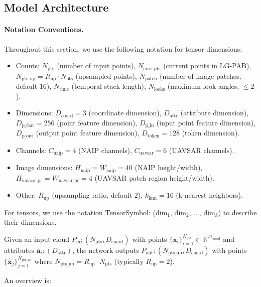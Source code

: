 \documentclass[preprint,12pt,authoryear]{elsarticle}
\begin{document}
\subsection{Model Architecture}
\label{sec:architecture}

\paragraph{Notation Conventions.}
Throughout this section, we use the following notation for tensor dimensions:
\begin{itemize}
    \item Counts: $N_{\text{pts}}$ (number of input points), $N_{\text{curr\_pts}}$ (current points in LG-PAB), $N_{\text{pts\_up}} = R_{\text{up}} \cdot N_{\text{pts}}$ (upsampled points), $N_{\text{patch}}$ (number of image patches, default 16), $N_{\text{time}}$ (temporal stack length), $N_{\text{looks}}$ (maximum look angles, $\leq 2$).
    \item Dimensions: $D_{\text{coord}} = 3$ (coordinate dimension), $D_{\text{attr}}$ (attribute dimension), $D_{\text{p\_feat}} = 256$ (point feature dimension), $D_{\text{p\_in}}$ (input point feature dimension), $D_{\text{p\_out}}$ (output point feature dimension), $D_{\text{token}} = 128$ (token dimension).
    \item Channels: $C_{\text{naip}} = 4$ (NAIP channels), $C_{\text{uavsar}} = 6$ (UAVSAR channels).
    \item Image dimensions: $H_{\text{naip}} = W_{\text{naip}} = 40$ (NAIP height/width), $H_{\text{uavsar\_pr}} = W_{\text{uavsar\_pr}} = 4$ (UAVSAR patch region height/width).
    \item Other: $R_{\text{up}}$ (upsampling ratio, default 2), $k_{\text{knn}} = 16$ (k-nearest neighbors).
\end{itemize}
For tensors, we use the notation TensorSymbol: (dim$_1$, dim$_2$, ..., dim$_k$) to describe their dimensions.

Given an input cloud $P_{\text{in}}: (N_{\text{pts}}, D_{\text{coord}})$ with points $\{\mathbf{x}_i\}_{i=1}^{N_{\text{pts}}}\subset\mathbb{R}^{D_{\text{coord}}}$ and attributes $\mathbf{a}_i: (D_{\text{attr}})$, the network outputs $P_{\text{out}}: (N_{\text{pts\_up}}, D_{\text{coord}})$ with points $\{\hat{\mathbf{x}}_j\}_{j=1}^{N_{\text{pts\_up}}}$ where $N_{\text{pts\_up}} = R_{\text{up}} \cdot N_{\text{pts}}$ (typically $R_{\text{up}} = 2$).

An overview is:
\end{document}
